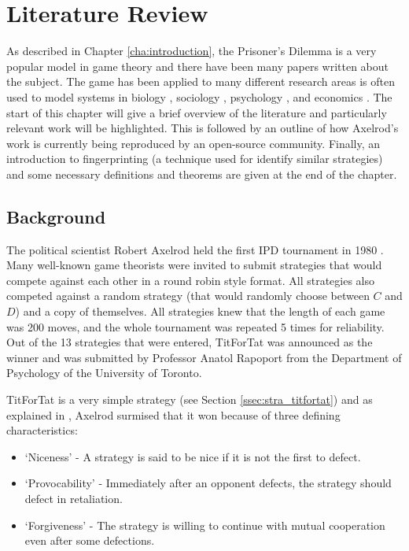 
\chapter{Literature Review}\label{cha:literature}

As described in Chapter \ref{cha:introduction}, the Prisoner's Dilemma is a very popular model in game theory and there have been many papers written about the subject.
The game has been applied to many different research areas is often used to model systems in biology \cite{Sigmund1999}, sociology \cite{Franken2005}, psychology \cite{Ishibuchi2005}, and economics \cite{Chong2005}.
The start of this chapter will give a brief overview of the literature and particularly relevant work will be highlighted.
This is followed by an outline of how Axelrod's work is currently being reproduced by an open-source community.
Finally, an introduction to fingerprinting (a technique used for identify
similar strategies) and some necessary definitions and theorems are given at the end of the chapter.


\section{Background}\label{sec:axelrodoriginal}

The political scientist Robert Axelrod held the first IPD tournament in 1980 \cite{Axelrod1980a}.
Many well-known game theorists were invited to submit strategies that would compete against each other in a round robin style format.
All strategies also competed against a random strategy (that would randomly choose between $C$ and $D$) and a copy of themselves.
All strategies knew that the length of each game was 200 moves, and the whole tournament was repeated 5 times for reliability.
Out of the 13 strategies that were entered, TitForTat was announced as the winner and was submitted by Professor Anatol Rapoport from the Department of Psychology of the University of Toronto.

TitForTat is a very simple strategy (see Section \ref{ssec:stra_titfortat}) and
as explained in \cite{Axelrod1980b}, Axelrod surmised that it won because of three defining characteristics:

\begin{itemize}
    \item `Niceness' - A strategy is said to be nice if it is not the first to defect.
    \item `Provocability' - Immediately after an opponent defects, the strategy should defect in retaliation.
    \item `Forgiveness' - The strategy is willing to continue with mutual cooperation even after some defections.
\end{itemize}

